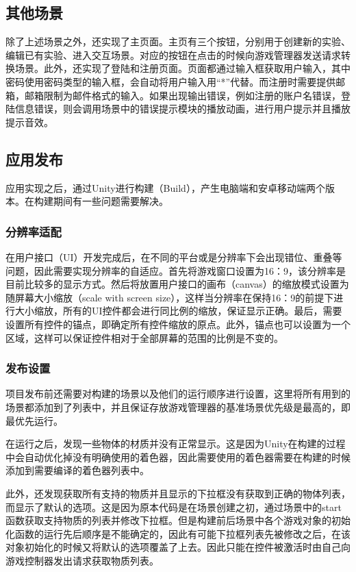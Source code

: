 \subsection{其他场景}

    除了上述场景之外，还实现了主页面。主页有三个按钮，分别用于创建新的实验、编辑已有实验、进入交互场景。对应的按钮在点击的时候向游戏管理器发送请求转换场景。此外，还实现了登陆和注册页面。页面都通过输入框获取用户输入，其中密码使用密码类型的输入框，会自动将用户输入用“*”代替。而注册时需要提供邮箱，邮箱限制为邮件格式的输入。如果出现输出错误，例如注册的账户名错误，登陆信息错误，则会调用场景中的错误提示模块的播放动画，进行用户提示并且播放提示音效。

\subsection{应用发布}

    应用实现之后，通过Unity进行构建（Build），产生电脑端和安卓移动端两个版本。在构建期间有一些问题需要解决。
    
\subsubsection{分辨率适配}

    在用户接口（UI）开发完成后，在不同的平台或是分辨率下会出现错位、重叠等问题，因此需要实现分辨率的自适应。首先将游戏窗口设置为16：9，该分辨率是目前比较多的显示方式。然后将放置用户接口的画布（canvas）的缩放模式设置为随屏幕大小缩放（scale with screen size），这样当分辨率在保持16：9的前提下进行大小缩放，所有的UI控件都会进行同比例的缩放，保证显示正确。最后，需要设置所有控件的锚点，即确定所有控件缩放的原点。此外，锚点也可以设置为一个区域，这样可以保证控件相对于全部屏幕的范围的比例是不变的。
    
\subsubsection{发布设置}

    项目发布前还需要对构建的场景以及他们的运行顺序进行设置，这里将所有用到的场景都添加到了列表中，并且保证存放游戏管理器的基准场景优先级是最高的，即最优先运行。
    
    在运行之后，发现一些物体的材质并没有正常显示。这是因为Unity在构建的过程中会自动优化掉没有明确使用的着色器，因此需要使用的着色器需要在构建的时候添加到需要编译的着色器列表中。
    
    此外，还发现获取所有支持的物质并且显示的下拉框没有获取到正确的物体列表，而显示了默认的选项。这是因为原本代码是在场景创建之初，通过场景中的start函数获取支持物质的列表并修改下拉框。但是构建前后场景中各个游戏对象的初始化函数的运行先后顺序是不能确定的，因此有可能下拉框列表先被修改之后，在该对象初始化的时候又将默认的选项覆盖了上去。因此只能在控件被激活时由自己向游戏控制器发出请求获取物质列表。
    
